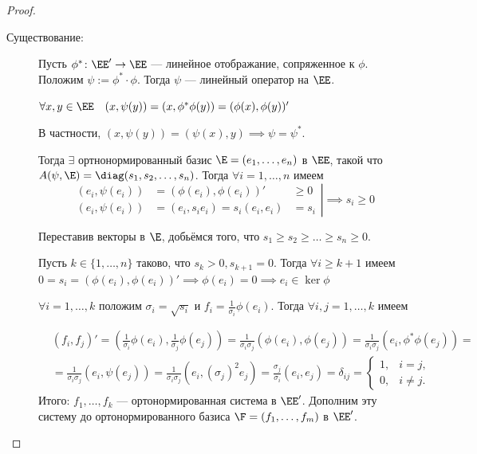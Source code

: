 \begin{proof}
    \begin{description}
        \item[Существование:] \mbox{}

        Пусть $\phi^{*} \colon \EE' \to \EE$ --- линейное отображание, сопряженное к $\phi$. Положим $\psi := \phi^{*} \cdot \phi$. Тогда $\psi$ --- линейный оператор на $\EE$.

        $\forall x, y \in \EE \quad (x, \psi(y)) = (x, \phi^{*} \phi(y)) = (\phi(x), \phi(y))'$

        В частности, $(x, \psi(y)) = (\psi(x), y) \implies \psi = \psi^{*}.$
    
        Тогда $\exists$ ортнонормированный базис $\E = (e_1, \dots, e_n)$ в $\EE$, такой что $A(\psi, \E) = \diag(s_1, s_2, \dots, s_n)$. Тогда $\forall i = 1, \dots, n$ имеем
        \begin{equation*}
            \left.
                \begin{aligned}
                (e_i,\psi(e_i)) &= (\phi(e_i),\phi(e_i))' &\geq 0 \\
                (e_i,\psi(e_i)) &= (e_i, s_i e_i) = s_i(e_i,e_i) &= s_i
                \end{aligned}
            \right|
                \implies s_i \geq 0
        \end{equation*}

        Переставив векторы в $\E$, добьёмся того, что $s_1 \geq s_2 \geq \dots \geq s_n \geq 0.$

        Пусть $k \in \{1, \dots, n\}$ таково, что $s_k > 0, s_{k+1} = 0$. Тогда $\forall i \geq k+1$ имеем $0 = s_i = (\phi(e_i), \phi(e_i))' \implies \phi(e_i) = 0 \implies e_i \in \ker \phi$
        
        $\forall i = 1, \dots, k$ положим $\sigma_i = \sqrt{s_i}$ и $f_i = \frac{1}{\sigma_i} \phi(e_i)$. Тогда $\forall i, j = 1, \dots, k$ имеем

        \begin{align*}
            &(f_i, f_j)' = (\frac{1}{\sigma_i} \phi(e_i), \frac{1}{\sigma_j} \phi(e_j)) = \frac{1}{\sigma_i \sigma_j} (\phi(e_i), \phi(e_j)) =  \frac{1}{\sigma_i \sigma_j} (e_i, \phi^{*} \phi (e_j)) = \\
            &=  \frac{1}{\sigma_i \sigma_j} (e_i, \psi(e_j)) =  \frac{1}{\sigma_i \sigma_j} (e_i, (\sigma_j)^2 e_j ) =  \frac{\sigma_j}{\sigma_i} (e_i, e_j) = \delta_{i j} =
            \begin{cases}
                1, &i = j, \\
                0, &i \neq j.
            \end{cases}
        \end{align*}
        Итого: $f_1, \dots, f_k$ --- ортонормированная система в $\EE'$. Дополним эту систему до ортонормированного базиса $\F = (f_1, \dots, f_m)$ в $\EE'$.


\end{description}
\end{proof}
